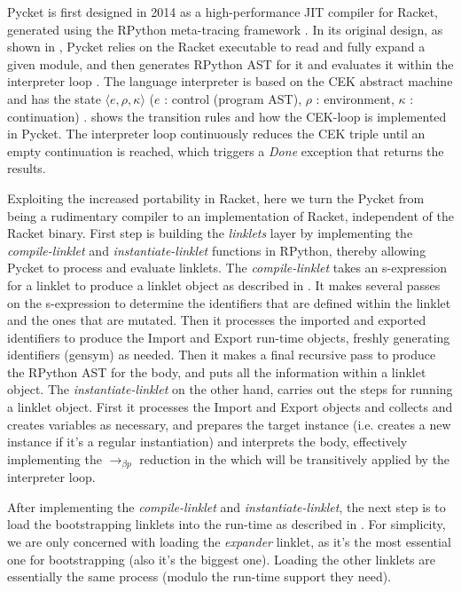 Pycket is first designed in 2014 as a high-performance JIT compiler
for Racket, generated using the RPython meta-tracing framework
\cite{bolz14-racket}. In its original design, as shown in
, Pycket relies on the Racket executable to
read and fully expand a given module\cite{samth:11}, and then
generates RPython AST for it and evaluates it within the interpreter
loop \cite{pycket15}. The language interpreter is based on the CEK
abstract machine and has the state $\langle e, \rho, \kappa \rangle$ ($e$ : control
(program AST), $\rho$ : environment, $\kappa$ : continuation)
\cite{felleisen87}.  shows the transition rules and
how the CEK-loop is implemented in Pycket. The interpreter loop
continuously reduces the CEK triple until an empty continuation is
reached, which triggers a \emph{Done} exception that returns the
results.

Exploiting the increased portability in Racket, here we turn the
Pycket from being a rudimentary compiler to an implementation of
Racket, independent of the Racket binary. First step is building the
\emph{linklets} layer by implementing the \emph{compile-linklet} and
\emph{instantiate-linklet} functions in RPython, thereby allowing
Pycket to process and evaluate linklets. The \emph{compile-linklet}
takes an s-expression for a linklet to produce a linklet object as
described in . It makes several
passes on the s-expression to determine the identifiers that are
defined within the linklet and the ones that are mutated. Then it
processes the imported and exported identifiers to produce the Import
and Export run-time objects, freshly generating identifiers (gensym)
as needed. Then it makes a final recursive pass to produce the RPython
AST for the body, and puts all the information within a linklet
object. The \emph{instantiate-linklet} on the other hand, carries out
the steps for running a linklet object. First it processes the Import
and Export objects and collects and creates variables as necessary,
and prepares the target instance (i.e. creates a new instance if it's
a regular instantiation) and interprets the body, effectively
implementing the $\longrightarrow_{\beta p}$ reduction in the 
which will be transitively applied by the interpreter loop.

After implementing the \emph{compile-linklet} and
\emph{instantiate-linklet}, the next step is to load the bootstrapping
linklets into the run-time as described in
. For simplicity, we are only concerned
with loading the \emph{expander} linklet, as it's the most essential
one for bootstrapping (also it's the biggest one). Loading the other
linklets are essentially the same process (modulo the run-time support
they need).

